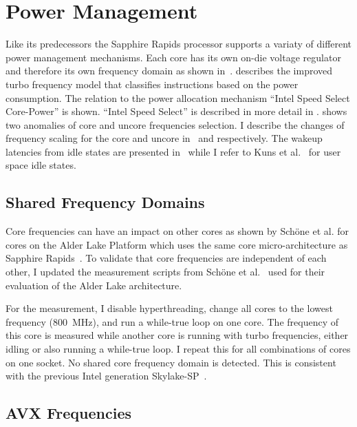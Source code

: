 \chapter{Power Management}
\label{sec:power_management}

Like its predecessors the Sapphire Rapids processor supports a variaty of different power management mechanisms.
Each core has its own on-die voltage regulator and therefore its own frequency domain as shown in~.
 describes the improved turbo frequency model that classifies instructions based on the power consumption.
The relation to the power allocation mechanism ``Intel Speed Select Core-Power'' is shown.
``Intel Speed Select'' is described in more detail in .
 shows two anomalies of core and uncore frequencies selection.
I describe the changes of frequency scaling for the core and uncore in~ and  respectively.
The wakeup latencies from idle states are presented in~ while I refer to Kuns et al.~\cite{Kuns_2025_UserSpaceIdle} for user space idle states.

\section{Shared Frequency Domains}
\label{sec:shared_freq_domains}
Core frequencies can have an impact on other cores as shown by Schöne et al. for cores on the Alder Lake Platform which uses the same core micro-architecture as Sapphire Rapids~\cite{Schoene_2024_Alder_Lake}.
To validate that core frequencies are independent of each other, I updated the measurement scripts from Sch\"one et al.~\cite{Schoene_2024_Alder_Lake} used for their evaluation of the Alder Lake architecture.

For the measurement, I disable hyperthreading, change all cores to the lowest frequency (\SI{800}{\MHz}), and run a while-true loop on one core.
The frequency of this core is measured while another core is running with turbo frequencies, either idling or also running a while-true loop.
I repeat this for all combinations of cores on one socket.
No shared core frequency domain is detected.
This is consistent with the previous Intel generation Skylake-SP~\cite[Sec. 2.6.3]{Intel_Optimization_Reference_Manual_050}.

\section{AVX Frequencies}
\label{sec:avx-frequencies}

